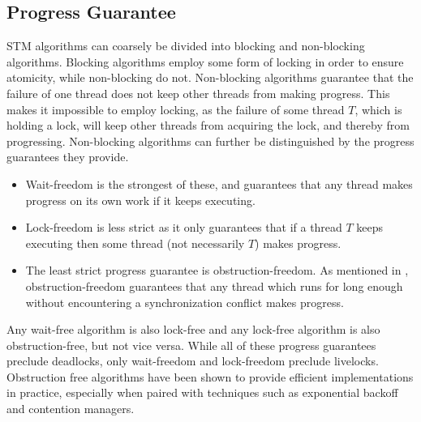 \subsection{Progress Guarantee}
\label{subsec:stm_impl_progress_guarantee}
\ac{STM} algorithms can coarsely be divided into blocking and non-blocking algorithms\cite[p. 47]{harris2010transactional}. Blocking algorithms employ some form of locking in order to ensure atomicity, while non-blocking do not\cite[p. 59]{herlihy2012art}. Non-blocking algorithms guarantee that the failure of one thread does not keep other threads from making progress\cite[p. 47]{harris2010transactional}\cite[p. 142]{herlihy1991wait}\cite[p. 59]{herlihy2012art}. This  makes it impossible to employ locking, as the failure of some thread $T$, which is holding a lock, will keep other threads from acquiring the lock, and thereby from progressing. Non-blocking algorithms can further be distinguished by the progress guarantees they provide. 
\begin{itemize}
	\item Wait-freedom is the strongest of these, and guarantees that any thread makes progress on its own work if it keeps executing\cite[p. 124]{herlihy1991wait}\cite[p. 59]{herlihy2012art}. 
	\item Lock-freedom is less strict as it only guarantees that if a thread $T$ keeps executing then some thread (not necessarily $T$) makes progress\cite[p. 47]{harris2010transactional}\cite[p. 60]{herlihy2012art}. 
	\item The least strict progress guarantee is obstruction-freedom\cite[p. 47]{harris2010transactional}\cite{herlihy2003obstruction}\cite[p. 61]{herlihy2012art}. As mentioned in , obstruction-freedom guarantees that any thread which runs for long enough without encountering a synchronization conflict makes progress\cite[p. 1]{herlihy2003obstruction}. 
\end{itemize}
Any wait-free algorithm is also lock-free and any lock-free algorithm is also obstruction-free, but not vice versa\cite[p. 60]{herlihy2012art}. While all of these progress guarantees preclude deadlocks, only wait-freedom and lock-freedom preclude livelocks\cite[p. 47]{harris2010transactional}. Obstruction free algorithms have been shown to provide efficient implementations in practice\cite[p. 61]{herlihy2012art}, especially when paired with techniques such as exponential backoff\cite[p. 147]{herlihy2012art} and contention managers\cite[p. 51]{harris2010transactional}.

